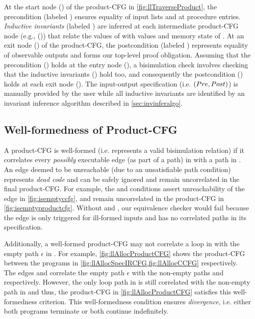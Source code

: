 At the start node () of the product-CFG in \cref{fig:llTraverseProduct},
the precondition \pre{} (labeled )
ensures equality of input lists  and  at procedure entries.
{\em Inductive invariants} (labeled ) are inferred
at each intermediate product-CFG node (e.g., ()) that relate
the values of \sprog{} with values and memory state of \cprog{}.
At an exit node () of the product-CFG, the postcondition \post{} (labeled )
represents equality of observable outputs and forms our top-level proof obligation.
Assuming that the precondition \pre{} () holds at the entry node (),
a bisimulation check involves checking that the inductive invariants () hold too,
and consequently the postcondition \post{} () holds at each exit node ().
The input-output specification (i.e. $({Pre}{},{Post}{})$) is manually provided by the user
while all inductive invariants are identified by an invariant inference algorithm described in \cref{sec:invinferalgo}.

\subsection{Well-formedness of Product-CFG}
\label{sec:wellformedproductcfg}
A product-CFG is well-formed (i.e. represents a valid bisimulation relation) if it correlates every {\em possibly} executable
edge (as part of a path) in \cprog{} with a path in \sprog{}.
An edge deemed to be unreachable (due to an unsatisfiable path condition) represents {\em dead code} and can be
safely ignored and remain uncorrelated in the final product-CFG.
For example, the \sdef{} and \pre{} conditions assert unreachability of the edge  in \cref{fig:isemptyccfg},
and remain uncorrelated in the product-CFG in \cref{fig:isemptyproductcfg}.
Without \sdef{} and \pre{}, our equivalence checker would fail because the edge  is only triggered for ill-formed
inputs and has no correlated paths in its specification.

Additionally, a well-formed product-CFG may not correlate a loop in \cprog{} with the empty path $\epsilon$ in \sprog{}.
For example, \cref{fig:llAllocProductCFG} shows the product-CFG between the programs
in \cref{fig:llAllocSpecIRCFG,fig:llAllocCCFG} respectively.
The edges  and  correlate the empty path $\epsilon$
with the non-empty paths  and  respectively.
However, the only loop path  in \cprog{} is still correlated with the non-empty path 
in \sprog{} and thus, the product-CFG in \cref{fig:llAllocProductCFG} satisfies this well-formedness criterion.
This well-formedness condition ensures {\em divergence}, i.e. either both programs terminate or
both continue indefinitely.

